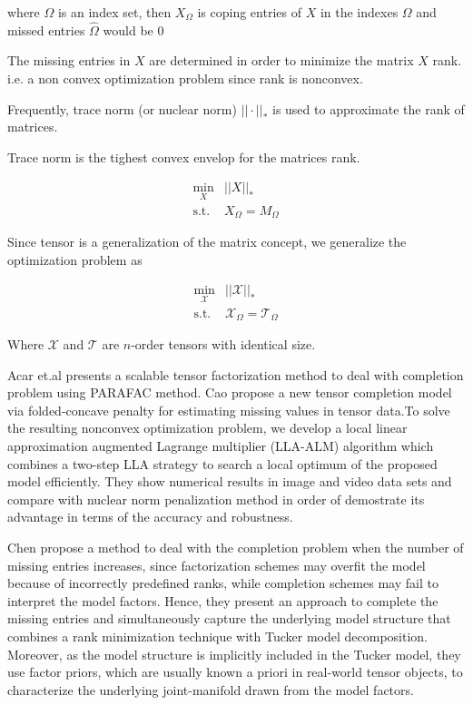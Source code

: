 \documentclass[letterpaper,12pt]{article}
\begin{document}
where $\Omega$ is an index set, then $X_\Omega$ is coping entries of $X$ in the indexes $\Omega$ and missed entries $\hat{\Omega}$ would be $0$

The missing entries in $X$ are determined in order to minimize the matrix $X$ rank. i.e. a non convex optimization problem since rank is nonconvex.

Frequently, trace norm (or nuclear norm) $||\cdot ||_*$ is used to approximate the rank of matrices.

Trace norm is the tighest convex envelop for the matrices rank.

\begin{equation} 
 \begin{split}
  \min_X & ||X||_*\\
  \text{s.t. } & X_\Omega = M_\Omega
 \end{split}
\end{equation}

Since tensor is a generalization of the matrix concept, we generalize the  optimization problem as

\begin{equation} 
 \begin{split}
  \min_{\mathcal{X}} & ||\mathcal{X}||_*\\
  \text{s.t. } & \mathcal{X}_\Omega = \mathcal{T}_\Omega
 \end{split}
\end{equation}

Where $\mathcal{X}$ and $\mathcal{T}$ are $n$-order tensors with identical size.

Acar et.al \cite{Acar2011} presents a scalable tensor factorization method to deal with completion problem using PARAFAC method. Cao \cite{Cao2015} propose a new tensor completion model via folded-concave penalty for estimating missing values in tensor data.To solve the resulting nonconvex optimization problem, we develop a local linear approximation augmented Lagrange multiplier (LLA-ALM) algorithm which combines a two-step LLA strategy to search a local optimum of the proposed model efficiently. They show numerical results in image and video data sets and compare with nuclear norm penalization method in order of demostrate its advantage in terms of the accuracy and robustness.


Chen \cite{Chen2014} propose a method to deal with the completion problem when the number of missing entries increases, since factorization schemes may overfit the model because of incorrectly predefined ranks, while completion schemes may fail to interpret the model factors.  
Hence, they present an approach to complete the missing entries and simultaneously capture the underlying model structure that combines a rank minimization technique with Tucker model decomposition. Moreover, as the model structure is implicitly included in the Tucker model, they  use factor priors, which are usually known a priori in real-world tensor objects, to characterize the underlying joint-manifold drawn from the model factors.
\end{document}
